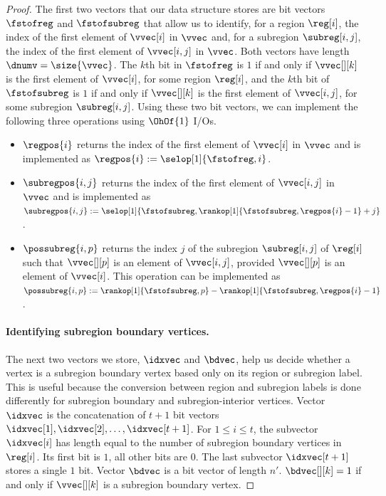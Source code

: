 {\begin{proof}
  The first two vectors that our data structure stores are bit vectors
  $\fstofreg$ and $\fstofsubreg$ that
  allow us to identify, for a region $\reg[i]$, the index of the first
  element of $\vvec[i]$ in $\vvec$ and, for a subregion $\subreg[i,j]$,
  the index of the first element of $\vvec[i,j]$ in $\vvec$.
  Both vectors have length $\dnumv = \size{\vvec}$.
  The $k$th bit in $\fstofreg$ is $1$ if and only if $\vvec[][k]$ is the
  first element of $\vvec[i]$, for some region $\reg[i]$,
  and the $k$th bit of $\fstofsubreg$ is $1$
  if and only if $\vvec[][k]$ is the first element of $\vvec[i,j]$, for some
  subregion $\subreg[i,j]$.
  Using these two bit vectors, we can implement the following three operations
  using $\OhOf{1}$ I/Os.
  \begin{itemize}
  \item $\regpos{i}$ returns the index of the first element of $\vvec[i]$
    in $\vvec$ and is implemented as $\regpos{i} := \selop[1]{\fstofreg,i}$.
  \item $\subregpos{i,j}$ returns the index of the first element of $\vvec[i,j]$
    in $\vvec$ and is implemented as\\
    $\subregpos{i,j} := \selop[1]{\fstofsubreg,\rankop[1]{\fstofsubreg,\regpos{i}-1}+j}$.
  \item $\possubreg{i,p}$ returns the index $j$ of the subregion $\subreg[i,j]$
    of $\reg[i]$ such that $\vvec[][p]$ is an element of  $\vvec[i,j]$,
    provided $\vvec[][p]$ is an element of $\vvec[i]$.
    This operation can be implemented as
    $\possubreg{i,p} := \rankop[1]{\fstofsubreg,p} - \rankop[1]{\fstofsubreg,
      \regpos{i} - 1}$.
  \end{itemize}

  \paragraph{Identifying subregion boundary vertices.}

  The next two vectors we store, $\idxvec$ and $\bdvec$, help us decide whether
  a vertex is a subregion boundary vertex based only on its region or subregion
  label.
  This is useful because the conversion between region and subregion
  labels is done differently for subregion boundary and subregion-interior
  vertices.
  Vector $\idxvec$ is the concatenation of $t+1$ bit vectors
  $\idxvec[1], \idxvec[2], \dots, \idxvec[t+1]$.
  For $1 \le i \le t$, the subvector $\idxvec[i]$ has length equal to the
  number of subregion boundary vertices in $\reg[i]$.
  Its first bit is $1$, all other bits are $0$.
  The last subvector $\idxvec[t+1]$ stores a single $1$ bit.
  Vector $\bdvec$ is a bit vector of length $n'$.
  $\bdvec[][k] = 1$ if and only if $\vvec[][k]$ is a subregion boundary
  vertex.


\end{proof}}
